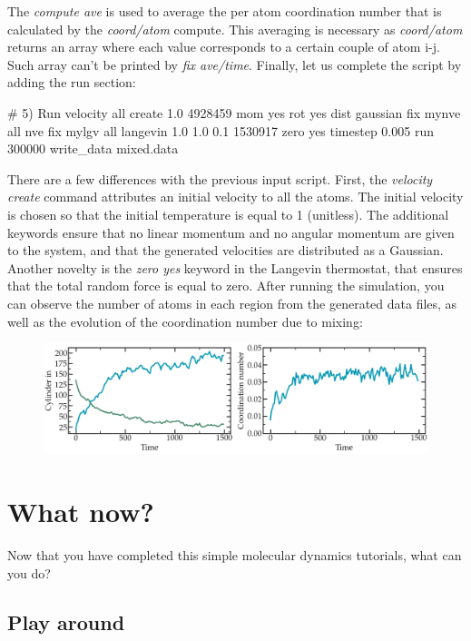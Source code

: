 \noindent The \textit{compute ave} is used to average the per atom
coordination number that is calculated by the \textit{coord/atom} compute.
This averaging is necessary as \textit{coord/atom} returns an array where each value corresponds 
to a certain couple of atom i-j. Such array can't be printed by \textit{fix ave/time}. 
Finally, let us complete the script by adding the run section:

\begin{lcverbatim}
# 5) Run
velocity all create 1.0 4928459 mom yes rot yes dist gaussian
fix mynve all nve
fix mylgv all langevin 1.0 1.0 0.1 1530917 zero yes
timestep 0.005
run 300000
write_data mixed.data
\end{lcverbatim}

\noindent There are a few differences with the
previous input script. First, the \textit{velocity create}
command attributes an initial velocity to all the atoms.
The initial velocity is chosen so that the initial
temperature is equal to 1 (unitless). The additional
keywords ensure that no linear momentum and no angular
momentum are given to the system, and that the generated
velocities are distributed as a Gaussian. Another novelty
is the \textit{zero yes} keyword in the Langevin thermostat, that
ensures that the total random force is equal to zero.
After running the simulation, you can observe the number
of atoms in each region from the generated data files, as
well as the evolution of the coordination number due to
mixing:

\begin{figure}
\includegraphics[width=\linewidth]{tutorials/level0/lennard-jones-fluid/population-light.png}
\end{figure}

\section{What now?}

\noindent Now that you have completed this simple molecular dynamics tutorials, what can you do?

\subsection{Play around}

